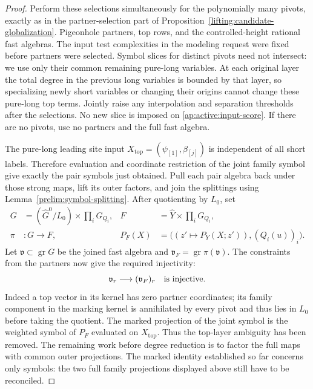 \begin{proof}
Perform these selections simultaneously for the polynomially many
pivots, exactly as in the partner-selection part of
Proposition~\ref{lifting:candidate-globalization}.  Pigeonhole
partners, top rows, and the controlled-height rational fast algebras.
The input test complexities in the modeling request were fixed
before partners were selected.  Symbol slices for distinct pivots
need not intersect: we use only their common remaining pure-long
variables.  At each original layer the total degree in the previous
long variables is bounded by that layer, so specializing newly
short variables or changing their origins cannot change these
pure-long top terms.  Jointly raise any interpolation and separation
thresholds after the selections.  No new slice is imposed on
\eqref{ap:active:input-score}.  If there are no pivots, use no
partners and the full fast algebra.

The pure-long leading site input
$X_{\mathrm{top}}=(\psi_{[1]},\beta_{[j]})$ is independent of all
short labels.  Therefore evaluation and coordinate restriction of
the joint family symbol give exactly the pair symbols just obtained.
Pull each pair algebra back under those strong maps, lift its outer
factors, and join the splittings using
Lemma~\ref{prelim:symbol-splitting}.  After quotienting by $L_0$, set
\begin{equation}
 \begin{aligned}
 G&=(\widehat G^0/L_0)\times\prod_iG_{Q_i},
 &F&=\widehat Y\times\prod_iG_{Q_i},\\
 \pi&:G\longrightarrow F,
 &P_F(X)&=\bigl((z'\mapsto P_Y(X;z')),(Q_i(u))_i\bigr).
 \end{aligned}
 \label{ap:active:joint-groups}
\end{equation}
Let $\mathfrak v\subset\operatorname{gr}G$ be the joined fast
algebra and $\mathfrak v_F=\operatorname{gr}\pi(\mathfrak v)$.
The constraints from the partners now give the required injectivity:
\[
               \mathfrak v_r\longrightarrow(\mathfrak v_F)_r
               \quad\hbox{is injective}.
\]
Indeed a top vector in its kernel has zero partner coordinates;
its family component in the marking kernel is annihilated by every
pivot and thus lies in $L_0$ before taking the quotient.  The marked
projection of the joint symbol is the weighted symbol of $P_F$
evaluated on $X_{\mathrm{top}}$.  Thus the top-layer ambiguity has been removed.  The remaining work
before degree reduction is to factor the full maps with common outer
projections.  The marked identity established so far concerns only
symbols: the two full family projections displayed above still have
to be reconciled.


\end{proof}
